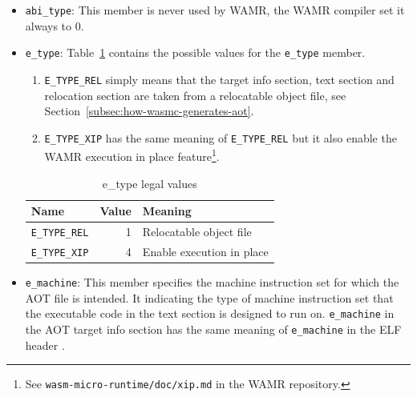 \documentclass{article}
\begin{document}
\begin{itemize}
        In the Table~\ref{table:bin-type-legal-value} all the little endian entry have the first least significant bit set to 0 and all the big endian entry have the first least significant bit set to 1.
        So with \verb|bin_type & 1| you can know if the AOT file is targeting a little endian or big endian machine.
        In the Table~\ref{table:bin-type-legal-value} all the 32-bit entry have the second least significant bit set to 0 and all the 64-bit entry have the second least significant bit set to 1.
        So with \verb|bin_type & 2| you can know if the AOT file is targeting a 32-bit or 64-bit machine.
        The value 5 in Table~\ref{table:bin-type-legal-value} is missing for these two reasons.

    \item \verb|abi_type|:
        This member is never used by WAMR, the WAMR compiler set it always to 0.

    \item \verb|e_type|:
        Table~\ref{table:e-type-legal-value} contains the possible values for the \verb|e_type| member.
        \begin{enumerate}
            \item \verb|E_TYPE_REL| simply means that the target info section, text section and relocation section are taken from a relocatable object file, see Section~\ref{subsec:how-wasmc-generates-aot}.
            \item \verb|E_TYPE_XIP| has the same meaning of \verb|E_TYPE_REL| but it also enable the WAMR execution in place feature\footnote{See \texttt{wasm-micro-runtime/doc/xip.md} in the WAMR repository.}.
        \end{enumerate}

        \begin{table}[H]
        \centering
        \begin{tabular}{lrl}
            \hline
            Name & Value & Meaning \\
            \hline
            \verb|E_TYPE_REL| & 1 & Relocatable object file \\
            \verb|E_TYPE_XIP| & 4 & Enable execution in place \\
            \hline
        \end{tabular}
        \caption{e\_type legal values}
        \label{table:e-type-legal-value}
        \end{table}

    \item \verb|e_machine|:
        This member specifies the machine instruction set for which the AOT file is intended.
        It indicating the type of machine instruction set that the executable code in the text section is designed to run on. \verb|e_machine| in the AOT target info section has the same meaning of \verb|e_machine| in the ELF header \cite[Ch.~2]{elf-spec-gabi-v42}.


\end{itemize}
\end{document}
